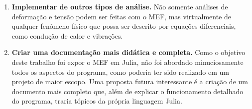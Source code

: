 \begin{enumerate}
    \item \textbf{Implementar de outros tipos de análise.} Não somente análises de deformação e tensão podem ser feitas com o MEF, mas virtualmente de qualquer fenômeno físico que possa ser descrito por equações diferenciais, como condução de calor e vibrações.
    \item \textbf{Criar uma documentação mais didática e completa.} Como o objetivo deste trabalho foi expor o MEF em Julia, não foi abordado minuciosamente todos os aspectos do programa, como poderia ter sido realizado em um projeto de maior escopo. Uma proposta futura interessante é a criação de um documento mais completo que, além de explicar o funcionamento detalhado do programa, traria tópicos da própria linguagem Julia.
\end{enumerate}

